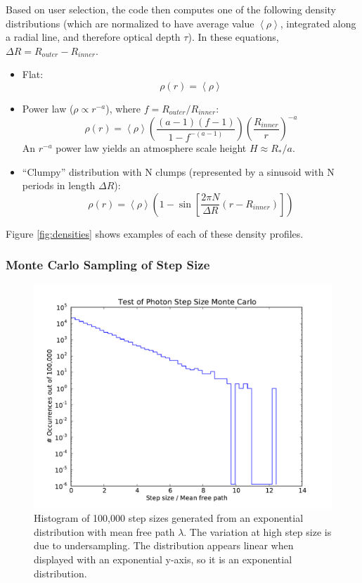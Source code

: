 \documentclass{amsart}
\begin{document}
Based on user selection, the code then computes one of the following
density distributions (which are normalized to have average value $\left<\rho\right>$,
integrated along a radial line, and therefore optical depth $\tau$).  In
these equations, $\Delta{R}=R_{outer}-R_{inner}$.
\begin{itemize}
\item Flat:
\begin{equation}
	\rho(r) = \left<\rho\right>
\end{equation}
\item Power law ($\rho{\propto}r^{-a}$), where $f=R_{outer}/R_{inner}$:
\begin{equation}
	\rho(r) = \left<\rho\right> \left( \frac{(a-1) (f-1)}
		  {1 - f^{-(a-1)}} \right)
		  \left(\frac{R_{inner}}{r}\right)^{-a}
\end{equation}
An $r^{-a}$ power law yields an atmosphere scale height $H{\approx}R_*/a$.
\item ``Clumpy'' distribution with N clumps (represented by a sinusoid with N periods in length $\Delta{R}$):
\begin{equation}
	\rho(r) = \left<\rho\right> \left( 1 - \sin\left[\frac{2\pi N}{\Delta{R}}(r-R_{inner}) \right] \right)
\end{equation}
\end{itemize}
Figure \ref{fig:densities} shows examples of each of these density profiles.

\subsubsection{Monte Carlo Sampling of Step Size}

\begin{figure}[h]
  \begin{center}
     \includegraphics[width=\textwidth]{mctest}
  \end{center}
  \caption{Histogram of 100,000 step sizes generated from an exponential
distribution with mean free path $\lambda$.  The variation at high
step size is due to undersampling.  The distribution appears linear when
displayed with an exponential y-axis, so it is an exponential distribution.}
  \label{fig:mctest}
\end{figure}
\end{document}
